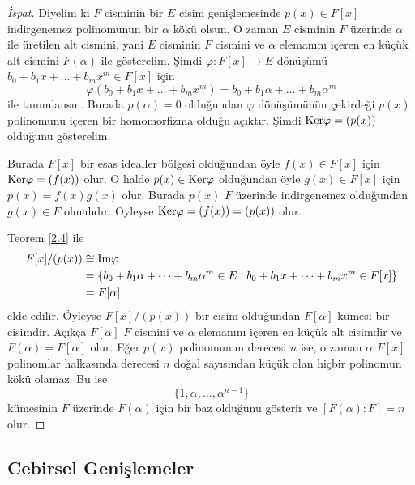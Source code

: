 \documentclass{article}
\theoremstyle{definition}
\theoremstyle{remark}
\begin{document}
			\begin{proof}[İspat]
			    Diyelim ki $F$ cisminin bir $E$ cisim genişlemesinde $p(x) \in F[x]$ indirgenemez polinomunun bir $\alpha$ kökü olsun. O zaman $E$ cisminin $F$ üzerinde $\alpha$ ile üretilen alt cismini, yani $E$ cisminin $F$ cismini ve $\alpha$ elemanını içeren en küçük alt cismini $F(\alpha)$ ile gösterelim. Şimdi $\varphi: F[x] \to E$ dönüşümü $b_0 + b_1x + \dots + b_mx^m \in F[x]$ için
			    \begin{equation*}
			        \varphi(b_0 + b_1x + \dots + b_mx^m) = b_0 + b_1\alpha + \dots + b_m\alpha^m
			    \end{equation*}
			    ile tanımlansın. Burada $p(\alpha) = 0$ olduğundan $\varphi$ dönüşümünün çekirdeği $p(x)$ polinomunu içeren bir homomorfizma olduğu açıktır. Şimdi $\textup{Ker}\varphi = (p(x))$ olduğunu gösterelim.\par
			    Burada $F[x]$ bir esas idealler bölgesi olduğundan öyle $f(x) \in F[x]$ için $\textup{Ker}\varphi = (f(x))$ olur. O halde $p(x) \in \textup{Ker}\varphi$ olduğundan öyle $g(x) \in F[x]$ için $p(x) = f(x)g(x)$ olur. Burada $p(x)$ $F$ üzerinde indirgenemez olduğundan $g(x) \in F$ olmalıdır. Öyleyse $\textup{Ker}\varphi = (f(x)) = (p(x))$ olur.\par
			    Teorem \ref{2.4} ile
			    \begin{align*}
			        F[x]/(p(x)) &\cong \textup{Im}\varphi\\
			        &= \{b_0 + b_1\alpha + \dots + b_m\alpha^m \in E : b_0 + b_1x + \dots + b_mx^m \in F[x]\}\\
			        &= F[\alpha]
			    \end{align*}
			    elde edilir. Öyleyse $F[x]/(p(x))$ bir cisim olduğundan $F[\alpha]$ kümesi bir cisimdir. Açıkça $F[\alpha]$ $F$ cismini ve $\alpha$ elemanını içeren en küçük alt cisimdir ve $F(\alpha) = F[\alpha]$ olur. Eğer $p(x)$ polinomunun derecesi $n$ ise, o zaman $\alpha$ $F[x]$ polinomlar halkasında derecesi $n$ doğal sayısından küçük olan hiçbir polinomun kökü olamaz. Bu ise
			    \begin{equation*}
			        \{1, \alpha, \dots, \alpha^{n - 1}\}
			    \end{equation*}
			    kümesinin $F$ üzerinde $F(\alpha)$ için bir baz olduğunu gösterir ve $[F(\alpha) : F] = n$ olur.
			\end{proof}
			
		\subsection{Cebirsel Genişlemeler}
		
\end{document}
